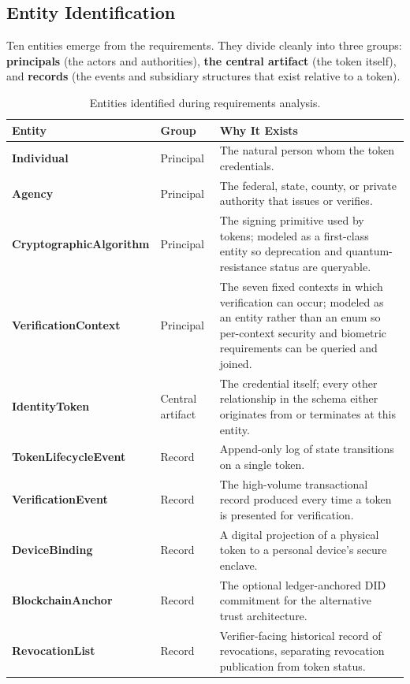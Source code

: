\documentclass[11pt,letterpaper]{article}
\newcommand{\thead}[1]{\textbf{\color{white}\small #1}}
\begin{document}
\subsection{Entity Identification}
\label{subsec:entity-id}

Ten entities emerge from the requirements. They divide cleanly into three groups: \textbf{principals} (the actors and authorities), \textbf{the central artifact} (the token itself), and \textbf{records} (the events and subsidiary structures that exist relative to a token).

\begin{table}[H]
\centering
\footnotesize
\caption{Entities identified during requirements analysis.}
\begin{tabularx}{\textwidth}{>{\bfseries}p{1.7in} l >{\RaggedRight\arraybackslash}X}
\toprule
\rowcolor{tabheader}
\thead{Entity} & \thead{Group} & \thead{Why It Exists} \\
\midrule
Individual & Principal & The natural person whom the token credentials. \\
Agency & Principal & The federal, state, county, or private authority that issues or verifies. \\
CryptographicAlgorithm & Principal & The signing primitive used by tokens; modeled as a first-class entity so deprecation and quantum-resistance status are queryable. \\
VerificationContext & Principal & The seven fixed contexts in which verification can occur; modeled as an entity rather than an enum so per-context security and biometric requirements can be queried and joined. \\
\midrule
IdentityToken & Central artifact & The credential itself; every other relationship in the schema either originates from or terminates at this entity. \\
\midrule
TokenLifecycleEvent & Record & Append-only log of state transitions on a single token. \\
VerificationEvent & Record & The high-volume transactional record produced every time a token is presented for verification. \\
DeviceBinding & Record & A digital projection of a physical token to a personal device's secure enclave. \\
BlockchainAnchor & Record & The optional ledger-anchored DID commitment for the alternative trust architecture. \\
RevocationList & Record & Verifier-facing historical record of revocations, separating revocation publication from token status. \\
\bottomrule
\end{tabularx}
\end{table}
\end{document}
